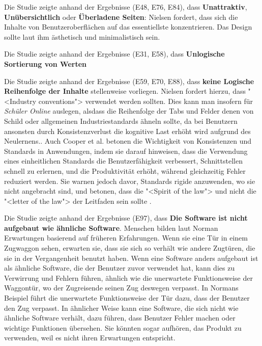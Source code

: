 Die Studie zeigte anhand der Ergebnisse (E48, E76, E84), dass \textbf{Unattraktiv}, \textbf{Unübersichtlich} oder \textbf{Überladene Seiten}: Nielsen fordert, dass sich die Inhalte von Benutzeroberflächen auf das essentiellste konzentrieren. Das Design sollte laut ihm ästhetisch und minimalistisch sein. \cite{Nielsen10}

Die Studie zeigte anhand der Ergebnisse (E31, E58), dass \textbf{Unlogische Sortierung von Werten}

Die Studie zeigte anhand der Ergebnisse (E59, E70, E88), dass \textbf{keine Logische Reihenfolge der Inhalte} stellenweise vorliegen. Nielsen fordert hierzu, dass "<Industry conventions"> \cite{Nielsen10} verwendet werden sollten. Dies kann man insofern für \textit{Schüler Online} auslegen, alsdass die Reihenfolge der Tabs und Felder denen von Schild oder allgemeinen Industriestandards ähneln sollte, da bei Benutzern ansonsten durch Konsistenzverlust die kognitive Last erhöht wird aufgrund des Neulernens.\cite{Nielsen10}. Auch Cooper et al. betonen die Wichtigkeit von Konsistenzen und Standards in Anwendungen, indem sie darauf hinweisen, dass die Verwendung eines einheitlichen Standards die Benutzerfähigkeit verbessert, Schnittstellen schnell zu erlernen, und die Produktivität erhöht, während gleichzeitig Fehler reduziert werden. Sie warnen jedoch davor, Standards rigide anzuwenden, wo sie nicht angebracht sind, und betonen, dass die "<Spirit of the law"> und nicht die "<letter of the law"> der Leitfaden sein sollte \cite{Cooper}.

Die Studie zeigte anhand der Ergebnisse (E97), dass \textbf{Die Software ist nicht aufgebaut wie ähnliche Software}. Menschen bilden laut Norman Erwartungen basierend auf früheren Erfahrungen. Wenn sie eine Tür in einem Zugwaggon sehen, erwarten sie, dass sie sich so verhält wie andere Zugtüren, die sie in der Vergangenheit benutzt haben. Wenn eine Software anders aufgebaut ist als ähnliche Software, die der Benutzer zuvor verwendet hat, kann dies zu Verwirrung und Fehlern führen, ähnlich wie die unerwartete Funktionsweise der Waggontür, wo der Zugreisende seinen Zug deswegen verpasst. In Normans Beispiel führt die unerwartete Funktionsweise der Tür dazu, dass der Benutzer den Zug verpasst.\cite{Norman} In ähnlicher Weise kann eine Software, die sich nicht wie ähnliche Software verhält, dazu führen, dass Benutzer Fehler machen oder wichtige Funktionen übersehen. Sie könnten sogar aufhören, das Produkt zu verwenden, weil es nicht ihren Erwartungen entspricht.  

